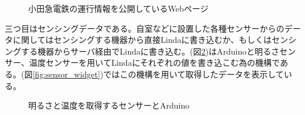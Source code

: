 \begin{figure}[htbp]
  \begin{minipage}{\hsize}
    \begin{center}
    \end{center}
    \caption{小田急電鉄の運行情報を公開しているWebページ}
    \label{fig:odakyu_page}
  \end{minipage}
\end{figure}

三つ目はセンシングデータである。自室などに設置した各種センサーからのデータに関してはセンシングする機器から直接Lindaに書き込むか、もしくはセンシングする機器からサーバ経由でLindaに書き込む。(図\ref{fig:arduino_sensor})はArduinoと明るさセンサー、温度センサーを用いてLindaにそれぞれの値を書き込こむ為の機構である。(図\ref{fig:sensor_widget})ではこの機構を用いて取得したデータを表示している。

\begin{figure}[htbp]
  \begin{minipage}{\hsize}
    \begin{center}
    \end{center}
    \caption{明るさと温度を取得するセンサーとArduino}
    \label{fig:arduino_sensor}
  \end{minipage}
\end{figure}

